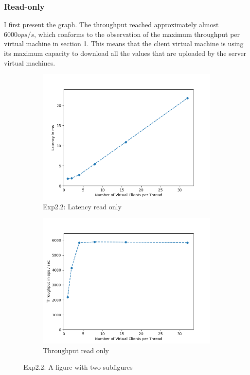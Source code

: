 \documentclass[11pt,a4paper]{article}
\begin{document}
\subsubsection{Read-only}

I first present the graph. 
The throughput reached approximately almost $6000ops/s$, which conforms to the observation of the maximum throughput per virtual machine in section 1.
This means that the client virtual machine is using its maximum capacity to download all the values that are uploaded by the server virtual machines.


\begin{figure}[H]
\centering
\begin{subfigure}{.5\textwidth}
    \centering
    \includegraphics[width=\textwidth]{img/exp2_2/exp2_2__latency_write_0.png}
    \caption{Exp2.2: Latency read only}
    \label{fig:mesh1}
\end{subfigure}%
\begin{subfigure}{.5\textwidth}
      \centering
    \includegraphics[width=\textwidth]{img/exp2_2/exp2_2__throughput_write_0.png}
    \caption{Throughput read only}
    \label{fig:mesh1}
\end{subfigure}
\caption{Exp2.2: A figure with two subfigures}
\label{fig:test}
\end{figure}
\end{document}
